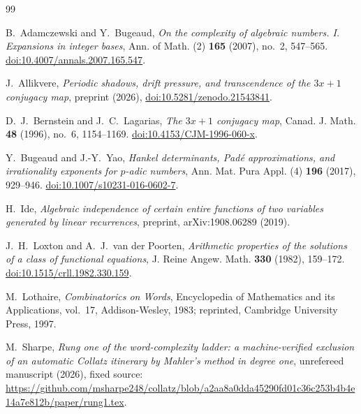 \documentclass[11pt]{amsart}
\theoremstyle{remark}
\theoremstyle{definition}
\numberwithin{equation}{section}
\begin{document}
\begin{thebibliography}{99}

B.~Adamczewski and Y.~Bugeaud, \emph{On the complexity of algebraic numbers. I. Expansions in integer bases}, Ann. of Math. (2) \textbf{165} (2007), no.~2, 547--565. \href{https://doi.org/10.4007/annals.2007.165.547}{doi:10.4007/annals.2007.165.547}.

J.~Allikvere, \emph{Periodic shadows, drift pressure, and transcendence of the $3x+1$ conjugacy map}, preprint (2026), \href{https://doi.org/10.5281/zenodo.21543841}{doi:10.5281/zenodo.21543841}.

D.~J.~Bernstein and J.~C.~Lagarias, \emph{The $3x+1$ conjugacy map}, Canad. J. Math. \textbf{48} (1996), no.~6, 1154--1169. \href{https://doi.org/10.4153/CJM-1996-060-x}{doi:10.4153/CJM-1996-060-x}.

Y.~Bugeaud and J.-Y.~Yao, \emph{Hankel determinants, Pad\'e approximations, and irrationality exponents for $p$-adic numbers}, Ann. Mat. Pura Appl. (4) \textbf{196} (2017), 929--946. \href{https://doi.org/10.1007/s10231-016-0602-7}{doi:10.1007/s10231-016-0602-7}.

H.~Ide, \emph{Algebraic independence of certain entire functions of two variables generated by linear recurrences}, preprint, arXiv:1908.06289 (2019).

J.~H.~Loxton and A.~J.~van der Poorten, \emph{Arithmetic properties of the solutions of a class of functional equations}, J. Reine Angew. Math. \textbf{330} (1982), 159--172. \href{https://doi.org/10.1515/crll.1982.330.159}{doi:10.1515/crll.1982.330.159}.

M.~Lothaire, \emph{Combinatorics on Words}, Encyclopedia of Mathematics and its Applications, vol.~17, Addison-Wesley, 1983; reprinted, Cambridge University Press, 1997.

M.~Sharpe, \emph{Rung one of the word-complexity ladder: a machine-verified exclusion of an automatic Collatz itinerary by Mahler's method in degree one}, unrefereed manuscript (2026), fixed source: \url{https://github.com/msharpe248/collatz/blob/a2aa8a0dda45290fd01c36c253b4b4e14a7e812b/paper/rung1.tex}.

\end{thebibliography}
\end{document}
